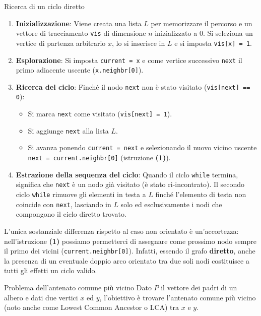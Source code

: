 \documentclass[12pt]{report}
\begin{document}
	\begin{algoritmo}{Ricerca di un ciclo diretto}{}	
		\begin{enumerate}
			\item \textbf{Inizializzazione}: Viene creata una lista $L$ per memorizzare il percorso e un vettore di tracciamento \texttt{vis} di dimensione $n$ inizializzato a $0$. Si seleziona un vertice di partenza arbitrario $x$, lo si inserisce in $L$ e si imposta \texttt{vis[x] = 1}.
			\item \textbf{Esplorazione}: Si imposta \texttt{current = x} e come vertice successivo \texttt{next} il primo adiacente uscente (\texttt{x.neighbr[0]}).
			\item \textbf{Ricerca del ciclo}: Finché il nodo \texttt{next} non è stato visitato (\texttt{vis[next] == 0}):
			\begin{itemize}
				\item Si marca \texttt{next} come visitato (\texttt{vis[next] = 1}).
				\item Si aggiunge \texttt{next} alla lista $L$.
				\item Si avanza ponendo \texttt{current = next} e selezionando il nuovo vicino uscente \texttt{next = current.neighbr[0]} (istruzione \textbf{(1)}).
			\end{itemize}
			\item \textbf{Estrazione della sequenza del ciclo}: Quando il ciclo \texttt{while} termina, significa che \texttt{next} è un nodo già visitato (è stato ri-incontrato). Il secondo ciclo \texttt{while} rimuove gli elementi in testa a $L$ finché l'elemento di testa non coincide con \texttt{next}, lasciando in $L$ solo ed esclusivamente i nodi che compongono il ciclo diretto trovato.
		\end{enumerate}
		
		L'unica sostanziale differenza rispetto al caso non orientato è un'accortezza: nell'istruzione \textbf{(1)} possiamo permetterci di assegnare come prossimo nodo sempre il primo dei vicini (\texttt{current.neighbr[0]}). Infatti, essendo il grafo \textbf{diretto}, anche la presenza di un eventuale doppio arco orientato tra due soli nodi costituisce a tutti gli effetti un ciclo valido.
	\end{algoritmo}
	
	\begin{esercizio}{Problema dell'antenato comune più vicino}{}
		Dato $P$ il vettore dei padri di un albero e dati due vertici $x$ ed $y$, l'obiettivo è trovare l'antenato comune più vicino (noto anche come Lowest Common Ancestor o LCA) tra $x$ e $y$.
	\end{esercizio}
	
\end{document}
